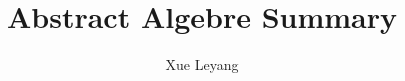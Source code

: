 
\usepackage{natbib}
\usepackage{multirow}
\usepackage[tone]{tipa}
\usepackage{indentfirst}
\renewcommand\thesection{\arabic {section}}
\setlength{\parindent}{2em}

\title{Abstract Algebre Summary}
\author{Xue Leyang}


	\maketitle
	\setcounter{page}{0} 
	\thispagestyle{empty}
	
	
